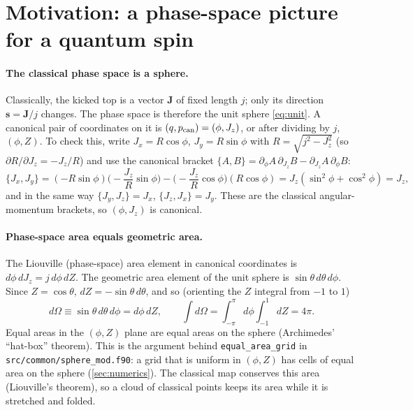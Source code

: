 \documentclass[11pt,a4paper]{article}
\newcommand{\vs}{\bm{s}}
\newcommand{\vJ}{\bm{J}}
\newcommand{\PB}[2]{\{#1,#2\}}
\begin{document}
\section{Motivation: a phase-space picture for a quantum spin}\label{sec:motivation}

\paragraph{The classical phase space is a sphere.} Classically, the kicked top is a vector $\vJ$ of fixed length $j$;
only its direction $\vs = \vJ/j$ changes. The phase space is therefore the unit sphere \eqref{eq:unit}. A canonical
pair of coordinates on it is $(q,p_{\rm can}) = (\phi, J_z)$, or after dividing by $j$, $(\phi,Z)$. To check this,
write $J_x = R\cos\phi$, $J_y = R\sin\phi$ with $R = \sqrt{j^2-J_z^2}$ (so $\partial R/\partial J_z = -J_z/R$) and use
the canonical bracket $\PB{A}{B} = \partial_\phi A\,\partial_{J_z}B - \partial_{J_z}A\,\partial_\phi B$:
\begin{equation*}
  \PB{J_x}{J_y} = (-R\sin\phi)\Big(-\frac{J_z}{R}\sin\phi\Big) - \Big(-\frac{J_z}{R}\cos\phi\Big)(R\cos\phi)
  = J_z(\sin^2\phi + \cos^2\phi) = J_z ,
\end{equation*}
and in the same way $\PB{J_y}{J_z} = J_x$, $\PB{J_z}{J_x} = J_y$. These are the classical angular-momentum brackets, so
$(\phi,J_z)$ is canonical.

\paragraph{Phase-space area equals geometric area.} The Liouville (phase-space) area element in canonical coordinates
is $d\phi\,dJ_z = j\,d\phi\,dZ$. The geometric area element of the unit sphere is $\sin\theta\,d\theta\,d\phi$. Since
$Z = \cos\theta$, $dZ = -\sin\theta\,d\theta$, and so (orienting the $Z$ integral from $-1$ to $1$)
\begin{equation}\label{eq:area}
  d\Omega \equiv \sin\theta\,d\theta\,d\phi = d\phi\,dZ, \qquad \int d\Omega = \int_{-\pi}^{\pi}\!d\phi\int_{-1}^{1}\!dZ = 4\pi .
\end{equation}
Equal areas in the $(\phi,Z)$ plane are equal areas on the sphere (Archimedes' ``hat-box'' theorem). This is the
argument behind \texttt{equal\_area\_grid} in \texttt{src/common/sphere\_mod.f90}: a grid that is uniform in
$(\phi,Z)$ has cells of equal area on the sphere (\cref{sec:numerics}). The classical map conserves this area
(Liouville's theorem), so a cloud of classical points keeps its area while it is stretched and folded.
\end{document}

